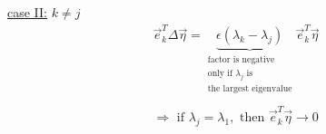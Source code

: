 \documentclass[a4paper,11pt]{article}
\begin{document}
\underline{case II:} $k \neq j$
\begin{equation}
	\begin{array}{l}
	\vec{e}_k^T \Delta \vec{\eta} = 
	\underbrace{ \epsilon (\lambda_k - \lambda_j) }_{
		\substack{\text{factor is negative} \\
			\text{only if } \lambda_j \text{ is} \\
			\text{the largest eigenvalue}}} 
		\vec{e}_k^T \vec{\eta} \\\\
	\Rightarrow \text{ if } \lambda_j = \lambda_1, \text{ then }
		\vec{e}_k^T \vec{\eta} \rightarrow 0
	\end{array}
\end{equation}
\end{document}
